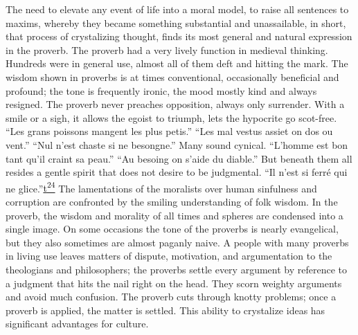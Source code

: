 The need to elevate any event of life into a moral model, to raise all
sentences to maxims, whereby they became something substantial and
unassailable, in short, that process of crystalizing thought, finds its
most general and natural expression in the proverb. The proverb had a
very lively function in medieval thinking. Hundreds were in general use,
almost all of them deft and hitting the mark. The wisdom shown in
proverbs is at times conventional, occasionally beneficial and profound;
the tone is frequently ironic, the mood mostly kind and always resigned.
The proverb never preaches opposition, always only surrender. With a
smile or a sigh, it allows the egoist to triumph, lets the hypocrite go
scot-free. ``Les grans poissons mangent les plus petis.'' ``Les mal
vestus assiet on dos ou vent.'' ``Nul n'est chaste si ne besongne.''
Many sound cynical. ``L'homme est bon tant qu'il craint sa peau.'' ``Au
besoing on s'aide du diable.'' But beneath them all resides a gentle
spirit that does not desire to be judgmental. ``Il n'est si ferré qui ne
glice.''\protect\hypertarget{18_Chapter_Eleven__THE_FORMS_OF_THO.xhtmlux5cux23id_2345}{\protect\hyperlink{23_NOTES.xhtmlux5cux23id_2346}{t\textsuperscript{24}}}
The lamentations of the moralists over human sinfulness and corruption
are confronted by the smiling understanding of folk
\protect\hypertarget{18_Chapter_Eleven__THE_FORMS_OF_THO.xhtmlux5cux23page_274}{}{}wisdom.
In the proverb, the wisdom and morality of all times and spheres are
condensed into a single image. On some occasions the tone of the
proverbs is nearly evangelical, but they also sometimes are almost
paganly naive. A people with many proverbs in living use leaves matters
of dispute, motivation, and argumentation to the theologians and
philosophers; the proverbs settle every argument by reference to a
judgment that hits the nail right on the head. They scorn weighty
arguments and avoid much confusion. The proverb cuts through knotty
problems; once a proverb is applied, the matter is settled. This ability
to crystalize ideas has significant advantages for culture.

